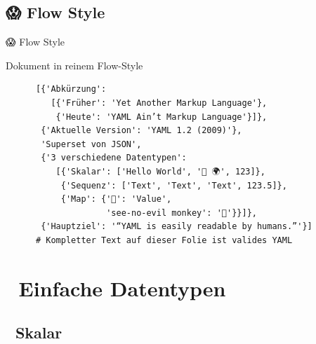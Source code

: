\documentclass{beamer}
\begin{document}
\subsection{😱 Flow Style}

\begin{frame}[fragile]{😱 Flow Style}
  \begin{block}{Dokument in reinem Flow-Style}~\\
    \begin{verbatim}
      [{'Abkürzung':
         [{'Früher': 'Yet Another Markup Language'},
          {'Heute': 'YAML Ain’t Markup Language'}]},
       {'Aktuelle Version': 'YAML 1.2 (2009)'},
       'Superset von JSON',
       {'3 verschiedene Datentypen':
          [{'Skalar': ['Hello World', '👋 🌍', 123]},
           {'Sequenz': ['Text', 'Text', 'Text', 123.5]},
           {'Map': {'🔑': 'Value',
                    'see-no-evil monkey': '🙈'}}]},
       {'Hauptziel': '“YAML is easily readable by humans.”'}]
      # Kompletter Text auf dieser Folie ist valides YAML
    \end{verbatim}
  \end{block}
\end{frame}

\section{🐣 Einfache Datentypen}

\subsection{📏  Skalar}
\end{document}
